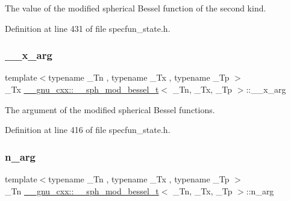 The value of the modified spherical Bessel function of the second kind. 



Definition at line 431 of file specfun\+\_\+state.\+h.

\mbox{\label{struct____gnu__cxx_1_1____sph__mod__bessel__t_ae4a4e05aa107855789a3b5859f9476e9}} 
\subsubsection{\texorpdfstring{\+\_\+\+\_\+x\+\_\+arg}{\_\_x\_arg}}
{\footnotesize\ttfamily template$<$typename \+\_\+\+Tn , typename \+\_\+\+Tx , typename \+\_\+\+Tp $>$ \\
\+\_\+\+Tx \hyperlink{struct____gnu__cxx_1_1____sph__mod__bessel__t}{\+\_\+\+\_\+gnu\+\_\+cxx\+::\+\_\+\+\_\+sph\+\_\+mod\+\_\+bessel\+\_\+t}$<$ \+\_\+\+Tn, \+\_\+\+Tx, \+\_\+\+Tp $>$\+::\+\_\+\+\_\+x\+\_\+arg}



The argument of the modified spherical Bessel functions. 



Definition at line 416 of file specfun\+\_\+state.\+h.

\mbox{\label{struct____gnu__cxx_1_1____sph__mod__bessel__t_afbd56c00f493b7bb6e3fbee5bcd1558d}} 
\subsubsection{\texorpdfstring{n\+\_\+arg}{n\_arg}}
{\footnotesize\ttfamily template$<$typename \+\_\+\+Tn , typename \+\_\+\+Tx , typename \+\_\+\+Tp $>$ \\
\+\_\+\+Tn \hyperlink{struct____gnu__cxx_1_1____sph__mod__bessel__t}{\+\_\+\+\_\+gnu\+\_\+cxx\+::\+\_\+\+\_\+sph\+\_\+mod\+\_\+bessel\+\_\+t}$<$ \+\_\+\+Tn, \+\_\+\+Tx, \+\_\+\+Tp $>$\+::n\+\_\+arg}



